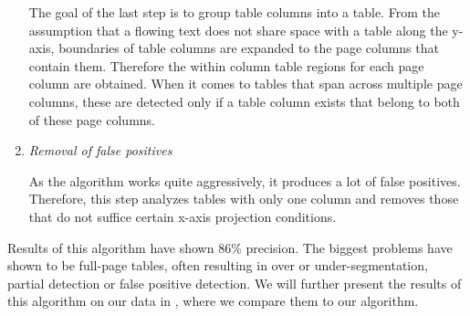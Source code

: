 \begin{enumerate}
The goal of the last step is to group table columns into a table. From the assumption that a flowing text does not share space with a table along the y-axis, boundaries of table columns are expanded to the page columns that contain them. Therefore the within column table regions for each page column are obtained. When it comes to tables that span across multiple page columns, these are detected only if a table column exists that belong to both of these page columns.

\item \emph{Removal of false positives}

As the algorithm works quite aggressively, it produces a lot of false positives. Therefore, this step analyzes tables with only one column and removes those that do not suffice certain x-axis projection conditions.

\end{enumerate}

Results of this algorithm have shown 86\% precision. The biggest problems have shown to be full-page tables, often resulting in over or under-segmentation, partial detection or false positive detection. We will further present the results of this algorithm on our data in , where we compare them to our algorithm.
   
